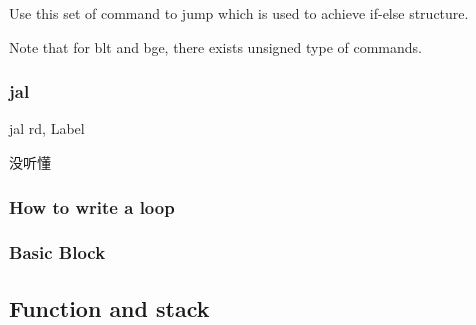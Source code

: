 \documentclass[12pt]{ctexart}
\theoremstyle{definition}
\theoremstyle{definition}
\theoremstyle{plain}
\begin{document}
Use this set of command to jump which is used to achieve if-else structure. 

Note that for blt and bge, there exists unsigned type of commands. 

\subsubsection{jal}
jal rd, Label

没听懂
\subsubsection{How to write a loop}

\subsubsection{Basic Block}




\subsubsection{} 



\subsection{Function and stack}
\end{document}
